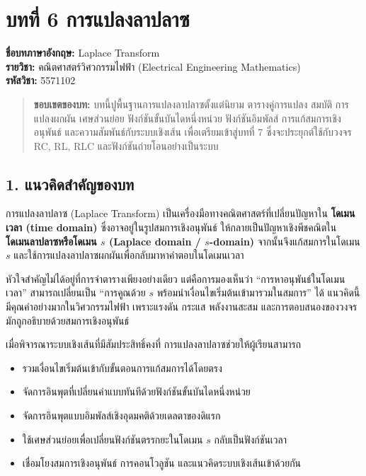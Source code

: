 \section{บทที่ 6 การแปลงลาปลาซ}

\textbf{ชื่อบทภาษาอังกฤษ:} Laplace Transform\\
\textbf{รายวิชา:} คณิตศาสตร์วิศวกรรมไฟฟ้า (Electrical Engineering Mathematics)\\
\textbf{รหัสวิชา:} 5571102


\begin{quote}
\textbf{ขอบเขตของบท:} บทนี้ปูพื้นฐานการแปลงลาปลาซตั้งแต่นิยาม ตารางคู่การแปลง สมบัติ การแปลงผกผัน เศษส่วนย่อย ฟังก์ชันขั้นบันไดหนึ่งหน่วย ฟังก์ชันอิมพัลส์ การแก้สมการเชิงอนุพันธ์ และความสัมพันธ์กับระบบเชิงเส้น เพื่อเตรียมเข้าสู่บทที่ 7 ซึ่งจะประยุกต์ใช้กับวงจร RC, RL, RLC และฟังก์ชันถ่ายโอนอย่างเป็นระบบ
\end{quote}



\subsection{1. แนวคิดสำคัญของบท}

การแปลงลาปลาซ (Laplace Transform) เป็นเครื่องมือทางคณิตศาสตร์ที่เปลี่ยนปัญหาใน \textbf{โดเมนเวลา (time domain)} ซึ่งอาจอยู่ในรูปสมการเชิงอนุพันธ์ ให้กลายเป็นปัญหาเชิงพีชคณิตใน \textbf{โดเมนลาปลาซหรือโดเมน $s$ (Laplace domain / $s$-domain)} จากนั้นจึงแก้สมการในโดเมน $s$ และใช้การแปลงลาปลาซผกผันเพื่อกลับมาหาคำตอบในโดเมนเวลา

หัวใจสำคัญไม่ได้อยู่ที่การจำตารางเพียงอย่างเดียว แต่คือการมองเห็นว่า “การหาอนุพันธ์ในโดเมนเวลา” สามารถเปลี่ยนเป็น “การคูณด้วย $s$ พร้อมนำเงื่อนไขเริ่มต้นเข้ามารวมในสมการ” ได้ แนวคิดนี้มีคุณค่าอย่างมากในวิศวกรรมไฟฟ้า เพราะแรงดัน กระแส พลังงานสะสม และการตอบสนองของวงจรมักถูกอธิบายด้วยสมการเชิงอนุพันธ์

เมื่อพิจารณาระบบเชิงเส้นที่มีสัมประสิทธิ์คงที่ การแปลงลาปลาซช่วยให้ผู้เรียนสามารถ

\begin{itemize}
    \item รวมเงื่อนไขเริ่มต้นเข้ากับขั้นตอนการแก้สมการได้โดยตรง
    \item จัดการอินพุตที่เปลี่ยนค่าแบบทันทีด้วยฟังก์ชันขั้นบันไดหนึ่งหน่วย
    \item จัดการอินพุตแบบอิมพัลส์เชิงอุดมคติด้วยเดลตาของดิแรก
    \item ใช้เศษส่วนย่อยเพื่อเปลี่ยนฟังก์ชันตรรกยะในโดเมน $s$ กลับเป็นฟังก์ชันเวลา
    \item เชื่อมโยงสมการเชิงอนุพันธ์ การคอนโวลูชัน และแนวคิดระบบเชิงเส้นเข้าด้วยกัน
\end{itemize}

